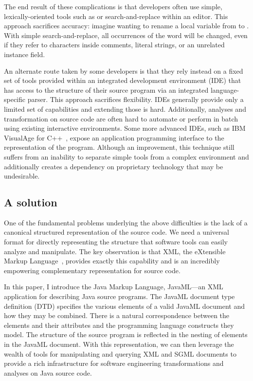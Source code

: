 \documentclass{article}
\begin{document}
The end result of these complications is that developers often use
simple, lexically-oriented tools such as  or search-and-replace
within an editor.  This approach sacrifices accuracy:
imagine wanting to rename a local variable from  to
.  With simple search-and-replace, all occurrences of
the word will be changed, even if they refer to characters inside
comments, literal strings, or an unrelated instance field.

An alternate route taken by some developers is that they rely instead on
a fixed set of tools provided within an integrated development
environment (IDE) that has access to the structure of their source
program via an integrated language-specific parser.  This approach
sacrifices flexibility.  IDEs generally provide only a limited set of
capabilities and extending those is hard.  Additionally, analyses and
transformation on source code are often hard to automate or perform in
batch using existing interactive environments.  Some more advanced
IDEs, such as IBM VisualAge for C++~\cite{Montana}, expose an
application programming interface to the representation of the program.
Although an improvement, this technique still suffers from an inability
to separate simple tools from a complex environment and additionally
creates a dependency on proprietary technology that may be undesirable.

\subsection{A solution}

One of the fundamental problems underlying the above difficulties is the
lack of a canonical structured representation of the source code.
We need a universal format for directly representing the structure that
software tools can easily analyze and manipulate.  The key
observation is that XML, the eXtensible Markup Language~\cite{XML}, provides
exactly this capability and is an incredibly empowering 
complementary representation for source code.

In this paper, I introduce the Java Markup Language, JavaML---an XML
application for describing Java source programs.  The JavaML document
type definition (DTD) specifies the various elements of a valid JavaML
document and how they may be combined.
There is a natural correspondence between the elements and
their attributes and the programming language constructs they model.
The structure of the source program is reflected in the nesting of
elements in the JavaML document.  With this representation, we can then
leverage the wealth of tools for manipulating and querying XML and SGML
documents to provide a rich infrastructure for software engineering
transformations and analyses on Java source code.  
\end{document}
